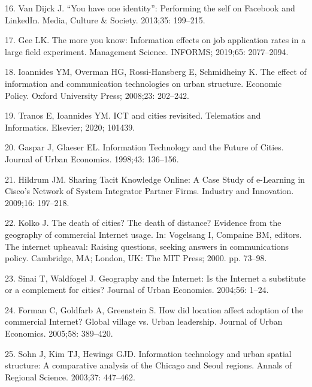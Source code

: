 \documentclass[10pt,letterpaper]{article}
\begin{document}
\leavevmode\hypertarget{ref-van_dijck_you_2013}{}%
16. Van Dijck J. ``You have one identity'': Performing the self on
Facebook and LinkedIn. Media, Culture \& Society. 2013;35: 199--215.

\leavevmode\hypertarget{ref-gee2019more}{}%
17. Gee LK. The more you know: Information effects on job application
rates in a large field experiment. Management Science. INFORMS; 2019;65:
2077--2094.

\leavevmode\hypertarget{ref-ioannides2008effect}{}%
18. Ioannides YM, Overman HG, Rossi-Hansberg E, Schmidheiny K. The
effect of information and communication technologies on urban structure.
Economic Policy. Oxford University Press; 2008;23: 202--242.

\leavevmode\hypertarget{ref-tranos2020ict}{}%
19. Tranos E, Ioannides YM. ICT and cities revisited. Telematics and
Informatics. Elsevier; 2020; 101439.

\leavevmode\hypertarget{ref-jess_gaspar_information_1998}{}%
20. Gaspar J, Glaeser EL. Information Technology and the Future of
Cities. Journal of Urban Economics. 1998;43: 136--156.

\leavevmode\hypertarget{ref-hildrum_sharing_2009}{}%
21. Hildrum JM. Sharing Tacit Knowledge Online: A Case Study of
e-Learning in Cisco's Network of System Integrator Partner Firms.
Industry and Innovation. 2009;16: 197--218.

\leavevmode\hypertarget{ref-kolko_death_2000}{}%
22. Kolko J. The death of cities? The death of distance? Evidence from
the geography of commercial Internet usage. In: Vogelsang I, Compaine
BM, editors. The internet upheaval: Raising questions, seeking answers
in communications policy. Cambridge, MA; London, UK: The MIT Press;
2000. pp. 73--98.

\leavevmode\hypertarget{ref-todd_sinai_geography_2004}{}%
23. Sinai T, Waldfogel J. Geography and the Internet: Is the Internet a
substitute or a complement for cities? Journal of Urban Economics.
2004;56: 1--24.

\leavevmode\hypertarget{ref-chris_forman_how_2005}{}%
24. Forman C, Goldfarb A, Greenstein S. How did location affect adoption
of the commercial Internet? Global village vs. Urban leadership. Journal
of Urban Economics. 2005;58: 389--420.

\leavevmode\hypertarget{ref-jungyul_sohn_information_2003}{}%
25. Sohn J, Kim TJ, Hewings GJD. Information technology and urban
spatial structure: A comparative analysis of the Chicago and Seoul
regions. Annals of Regional Science. 2003;37: 447--462.
\end{document}
